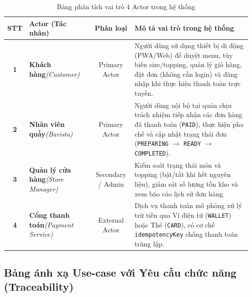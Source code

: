 \documentclass[12pt,a4paper]{article}
\begin{document}
\begin{table}[H]
\centering
\caption{Bảng phân tích vai trò 4 Actor trong hệ thống}
\label{tab:actors}
\vspace{0.2cm}
\small
\renewcommand{\arraystretch}{1.3}
\begin{tabularx}{\textwidth}{|c|>{\raggedright\arraybackslash}p{3cm}|c|>{\raggedright\arraybackslash}X|}
\hline
\rowcolor{tableheader}
\textbf{STT} & \textbf{Actor (Tác nhân)} & \textbf{Phân loại} & \textbf{Mô tả vai trò trong hệ thống} \\
\hline
\textbf{1} & \textbf{Khách hàng}\newline\textit{(Customer)} & Primary Actor & Người dùng sử dụng thiết bị di động (PWA/Web) để duyệt menu, tùy biến size/topping, quản lý giỏ hàng, đặt đơn (không cần login) và đăng nhập khi thực hiện thanh toán trực tuyến. \\
\hline
\textbf{2} & \textbf{Nhân viên quầy}\newline\textit{(Barista)} & Primary Actor & Người dùng nội bộ tại quán chịu trách nhiệm tiếp nhận các đơn hàng đã thanh toán (\texttt{PAID}), thực hiện pha chế và cập nhật trạng thái đơn (\texttt{PREPARING} $\rightarrow$ \texttt{READY} $\rightarrow$ \texttt{COMPLETED}). \\
\hline
\textbf{3} & \textbf{Quản lý cửa hàng}\newline\textit{(Store Manager)} & Secondary / Admin & Kiểm soát trạng thái món và topping (bật/tắt khi hết nguyên liệu), giám sát số lượng tồn kho và xem báo cáo lịch sử đơn hàng. \\
\hline
\textbf{4} & \textbf{Cổng thanh toán}\newline\textit{(Payment Service)} & External Actor & Dịch vụ thanh toán mô phỏng xử lý trừ tiền qua Ví điện tử (\texttt{WALLET}) hoặc Thẻ (\texttt{CARD}), có cơ chế \texttt{idempotencyKey} chống thanh toán trùng lặp. \\
\hline
\end{tabularx}
\end{table}

\clearpage

\subsection{Bảng ánh xạ Use-case với Yêu cầu chức năng (Traceability)}
\end{document}
